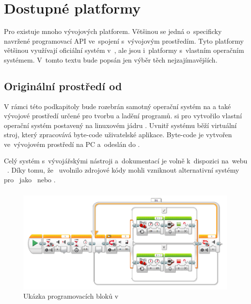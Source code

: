 \chapter{Dostupné platformy}

Pro \legoEV{} existuje mnoho vývojových platforem. 
Většinou se jedná o~specificky navržené programovací API ve~spojení s~vývojovým prostředím. 
Tyto platformy většinou využívají oficiální systém v~\EVthree{}, ale jsou i~platformy s~vlastním operačním systémem. 
V~tomto textu bude popsán jen výběr těch nejzajímavějších. %

\section{Originální prostředí od \lego}

V rámci této podkapitoly bude rozebrán samotný operační systém na \EVthree{} a také vývojové prostředí určené pro tvorbu a ladění programů. 
\lego{} si pro \EVthree{} vytvořilo vlastní operační systém postavený na linuxovém jádru \cite{legoMindstormsEV3_fw-dev-kit}. 
Uvnitř systému běží virtuální stroj, který zpracovává byte-code uživatelské aplikace. 
Byte-code je vytvořen ve~vývojovém prostředí na PC a~odeslán do . 

Celý systém s~vývojářskými nástroji a~dokumentací je volně k~dispozici na~webu \lego{}~\cite{legoMindstorms_download}. Díky tomu, že~\lego{} uvolnilo zdrojové kódy mohli vzniknout alternativní systémy pro~\EVthree{} jako~\evThreeDev{} nebo \evRT. 

\subsection{\legoSW{}}

\begin{figure}[h]
	\centering
	\includegraphics[width=0.99\textwidth]{images/lego-soft/lego-soft_robotut_switch-touch+motors+leds.png}
	\caption{Ukázka programovacích bloků v \legoSW}
	\label{fig:lego-soft_example-blocks}
\end{figure}

